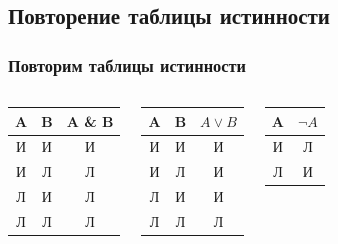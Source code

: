 \documentclass[compress,red]{beamer}
\begin{document}
\subsection{Повторение таблицы истинности}
\begin{frame}
    \frametitle{Повторим таблицы истинности}
    \begin{columns}[c]
            \begin{center}
              \begin{tabular}{|c|c|c|}
                \hline
                A & B & A \& B \\
                \hline
                И & И & И \\
                \hline
                И & Л & Л \\
                \hline
                Л & И & Л \\
                \hline
                Л & Л & Л \\
                \hline
              \end{tabular}
            \end{center}
            
            \begin{center}
                \begin{tabular}{|c|c|c|}
                    \hline
                    A & B & $A \vee B$ \\
                    \hline
                    И & И & И \\
                    \hline
                    И & Л & И \\
                    \hline
                    Л & И & И \\
                    \hline
                    Л & Л & Л \\
                    \hline
                \end{tabular}
            \end{center}

            \begin{center}
              \begin{tabular}{|c|c|}
                \hline
                A & ${\neg} A$ \\
                \hline
                И & Л \\
                \hline
                Л & И \\
                \hline
              \end{tabular}
            \end{center}
    \end{columns}                        
\end{frame}
\end{document}
